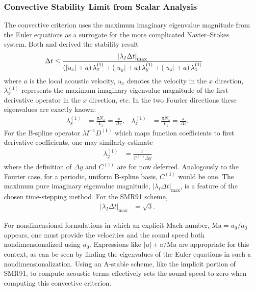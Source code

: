 \subsubsection{Convective Stability Limit from Scalar Analysis}
\label{sec:convectivestability}

The convective criterion uses the maximum imaginary eigenvalue magnitude from
the Euler equations as a surrogate for the more complicated Navier--Stokes
system.  Both \citet[Equation~2.39]{Kwok2002} and
\citet[Equations~4.20--21]{Guarini1998} derived the stability result
\begin{align}\label{eq:convectivestability}
  \Delta{}t &\leq
  \frac{%
    \left|\lambda_{I}\Delta{}t\right|_{\max}
  }{%
      \left(\left|u_{x}\right| + a\right) \lambda^{(1)}_x
    + \left(\left|u_{y}\right| + a\right) \lambda^{(1)}_y
    + \left(\left|u_{z}\right| + a\right) \lambda^{(1)}_z
  }
\end{align}
where $a$ is the local acoustic velocity, $u_{x}$ denotes the velocity in the
$x$ direction, $\lambda^{(1)}_x$ represents the maximum imaginary eigenvalue
magnitude of the first derivative operator in the $x$ direction, etc.  In the
two Fourier directions these eigenvalues are exactly known:
\begin{align}
    \lambda^{(1)}_x &= \frac{\pi N_x}{L_x} = \frac{\pi}{\Delta{}x},
    &
    \lambda^{(1)}_z &= \frac{\pi N_z}{L_z} = \frac{\pi}{\Delta{}z}.
\end{align}
For the B-spline operator $M^{-1} D^{(1)}$ which maps function coefficients to
first derivative coefficients, one may similarly estimate
\begin{align}\label{eq:lambda1deltay}
    \lambda^{(1)}_y &= \frac{\pi}{C^{(1)}\Delta{}y}
\end{align}
where the definition of $\Delta{}y$ and $C^{(1)}$ are for now deferred.
Analogously to the Fourier case, for a periodic, uniform B-spline basis,
$C^{(1)}$ would be one.  The maximum pure imaginary eigenvalue magnitude,
$\left|\lambda_{I}\Delta{}t\right|_{\max}$, is a feature of the chosen
time-stepping method.  For the SMR91 scheme,
\begin{align}
  \left|\lambda_{I}\Delta{}t\right|_{\max} &= \sqrt{3}.
\end{align}

For nondimensional formulations in which an explicit Mach number,
$\mbox{Ma}=u_0/a_0$ appears, one must provide the velocities and the
sound speed both nondimensionalized using $u_0$.  Expressions like
$\left|u\right| + a/\mbox{Ma}$ are appropriate for this context, as can be
seen by finding the eigenvalues of the Euler equations in such a
nondimensionalization.  Using an A-stable scheme, like the implicit portion of
SMR91, to compute acoustic terms effectively sets the sound speed to zero when
computing this convective criterion.

